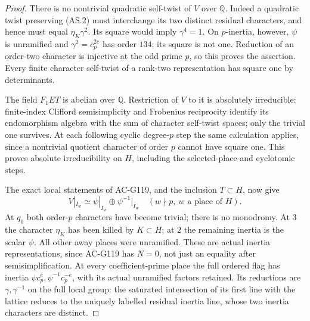\begin{proof}
There is no nontrivial quadratic self-twist of \(V\) over
\(\mathbb Q\).  Indeed a quadratic twist preserving (AS.2)
must interchange its two distinct residual characters, and hence
must equal \(\eta_K\gamma^2\).  Its square would imply
\(\gamma^4=1\).  On \(p\)-inertia, however, \(\psi\) is
unramified and \(\gamma^2=\bar c_p^{2e}\) has order \(134\);
its square is not one.  Reduction of an order-two character
is injective at the odd prime \(p\), so this proves the assertion.
Every finite character self-twist of a rank-two representation
has square one by determinants.

The field \(F_1ET\) is abelian over \(\mathbb Q\).
Restriction of \(V\) to it is absolutely irreducible:
finite-index Clifford semisimplicity and Frobenius reciprocity
identify its endomorphism algebra with the sum of character
self-twist spaces; only the trivial one survives.
At each following cyclic degree-\(p\) step the same calculation
applies, since a nontrivial quotient character of order \(p\)
cannot have square one.  This proves absolute irreducibility
on \(H\), including the selected-place and cyclotomic steps.

The exact local statements of AC-G119, and the inclusion
\(T\subset H\), now give
\[
 V|_{I_w}\simeq\psi|_{I_w}\oplus\psi^{-1}|_{I_w}
                       \quad(w\nmid p,\ w\text{ a place of }H).
 \tag{AS.8}
\]
At \(q_0\) both order-\(p\) characters have become trivial;
there is no monodromy.  At \(3\) the character \(\eta_K\)
has been killed by \(K\subset H\); at \(2\) the remaining
inertia is the scalar \(\psi\).  All other away places were
unramified.  These are actual inertia representations, since
AC-G119 has \(N=0\), not just an equality after semisimplification.
At every coefficient-prime place the full ordered flag has
inertia \(\psi c_p^e,\psi^{-1}c_p^{-e}\), with its actual
unramified factors retained.  Its reductions are
\(\gamma,\gamma^{-1}\) on the full local group: the saturated
intersection of its first line with the lattice reduces to
the uniquely labelled residual inertia line, whose two
inertia characters are distinct.


\end{proof}
